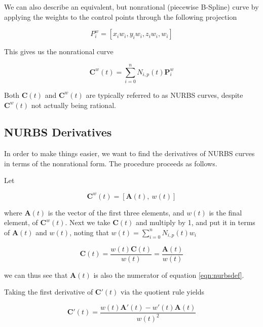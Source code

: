 
We can also describe an equivalent, but nonrational (piecewise B-Spline) curve by applying the weights to the control points through the following projection

\begin{equation}
	P^w_i = [x_iw_i,y_iw_i,z_iw_i,w_i]
\end{equation}

This gives us the nonrational curve

\begin{equation}
	\textbf{C}^w(t) = \sum^n_{i=0}N_{i,p}(t) \textbf{P}^w_i
\end{equation}

Both \(\textbf{C}(t)\) and \(\textbf{C}^w(t)\) are typically referred to as NURBS curves, despite \(\textbf{C}^w(t)\) not actually being rational.

\subsection{NURBS Derivatives}
In order to make things easier, we want to find the derivatives of NURBS curves in terms of the nonrational form. The procedure proceeds as follows.

Let 

\begin{equation}
	\textbf{C}^w(t) = [\textbf{A}(t),~w(t)]
\end{equation}

where \(\textbf{A}(t)\) is the vector of the first three elements, and \(w(t)\) is the final element, of \(\textbf{C}^w(t)\). Next we take \(\textbf{C}(t)\) and multiply by 1, and put it in terms of \(\textbf{A}(t)\) and \(w(t)\), noting that \(w(t)=\sum^n_{i=0}N_{i,p}(t) w_i \)

\begin{equation}
\label{eqn:nonrationalequiv}
	\textbf{C}(t) = \frac{ w(t) \textbf{C}(t) }{ w(t) } = \frac{ \textbf{A}(t) }{ w(t) }
\end{equation}

we can thus see that \(\textbf{A}(t)\) is also the numerator of equation \cref{eqn:nurbsdef}.

Taking the first derivative of $\textbf{C}'(t)$ via the quotient rule yields

\begin{equation}
	\textbf{C}'(t) = \frac{ w(t)\textbf{A}'(t) - w'(t) \textbf{A}(t) }{ w(t)^2 }
\end{equation}

